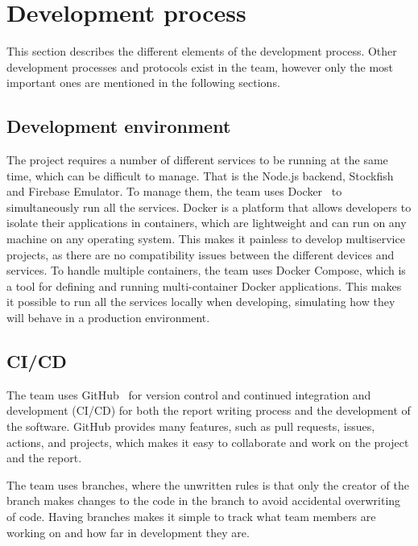 \section{Development process}\label{sec:development-process}

This section describes the different elements of the development process.
Other development processes and protocols exist in the team, however only the most important ones are mentioned in the
following sections.

\subsection{Development environment}\label{subsec:development-environment}

The project requires a number of different services to be running at the same time, which can be difficult to manage.
That is the Node.js backend, Stockfish and Firebase Emulator.
To manage them, the team uses Docker~\cite{docker} to simultaneously run all the services.
Docker is a platform that allows developers to isolate their applications in containers, which are lightweight and can
run on any machine on any operating system.
This makes it painless to develop multiservice projects, as there are no compatibility issues between the different
devices and services.
To handle multiple containers, the team uses Docker Compose, which is a tool for defining and running multi-container
Docker applications.
This makes it possible to run all the services locally when developing, simulating how they will behave in a production
environment.

\subsection{CI/CD}\label{subsec:ci/cd}

The team uses GitHub~\cite{github} for version control and continued integration and development (CI/CD) for both the
report writing process and the development of the software.
GitHub provides many features, such as pull requests, issues, actions, and projects, which makes it easy to collaborate
and work on the project and the report.

The team uses branches, where the unwritten rules is that only the creator of the branch makes changes to the code in
the branch to avoid accidental overwriting of code.
Having branches makes it simple to track what team members are working on and how far in development they are.

